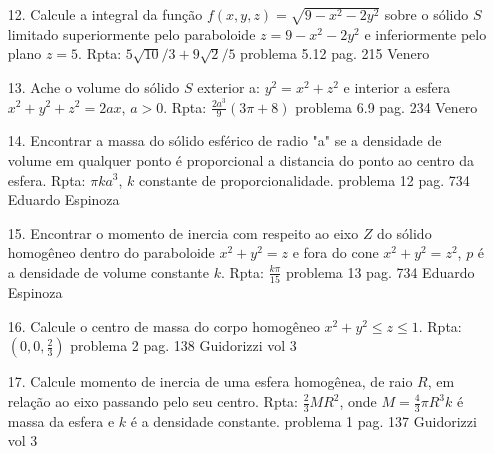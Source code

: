 \begin{itemize}
	\item [12.] Calcule a integral da função $f(x,y,z)=\sqrt{9-x^{2}-2y^{2}}$ sobre o sólido $S$limitado superiormente pelo paraboloide $z=9-x^{2}-2y^{2}$ e inferiormente pelo plano $z=5$. Rpta: $5\sqrt{10}/3 +9\sqrt{2}/5$
	 problema 5.12 pag. 215 Venero 
\end{itemize}
\begin{itemize}
	\item [13.] Ache o volume do sólido $S$ exterior a: $y^{2}=x^{2}+z^{2}$ e interior a  esfera $x^{2}+y^{2}+z^{2}=2ax$, $a>0$. Rpta:  $\frac{2a^{3}}{9}(3\pi +8)$ 
	 problema 6.9 pag. 234 Venero 
\end{itemize}
\begin{itemize}
	\item [14.]  Encontrar a massa do sólido esférico de radio "a" se a densidade de volume em qualquer ponto é proporcional a distancia do ponto ao centro da esfera. Rpta: $\pi ka^{3}$, $k$ constante de proporcionalidade. 
	 problema 12 pag. 734 Eduardo Espinoza
\end{itemize}
\begin{itemize}
	\item [15.] Encontrar o momento de inercia com respeito ao eixo $Z$ do sólido homogêneo dentro do paraboloide $x^{2}+y^{2}=z$ e fora do cone $x^{2}+y^{2}=z^{2}$, $p$ é a densidade de volume constante $k$.   Rpta: $\frac{k\pi}{15}$
	 problema 13 pag. 734 Eduardo Espinoza
\end{itemize}
\begin{itemize}
	\item [16.] Calcule o centro de massa do corpo homogêneo $x^{2}+y^{2}\leqslant z \leqslant 1$. Rpta: $(0,0,\frac{2}{3})$
	 problema 2 pag. 138 Guidorizzi vol 3 
\end{itemize}
\begin{itemize}
	\item [17.] Calcule momento de inercia de uma esfera homogênea, de raio $R$, em relação ao eixo passando pelo seu centro. Rpta: $\frac{2}{3}MR^{2}$, onde $M=\frac{4}{3}\pi R^{3}k$ é massa da esfera e $k$ é a densidade constante.
	 problema 1 pag. 137 Guidorizzi vol 3 
\end{itemize}

